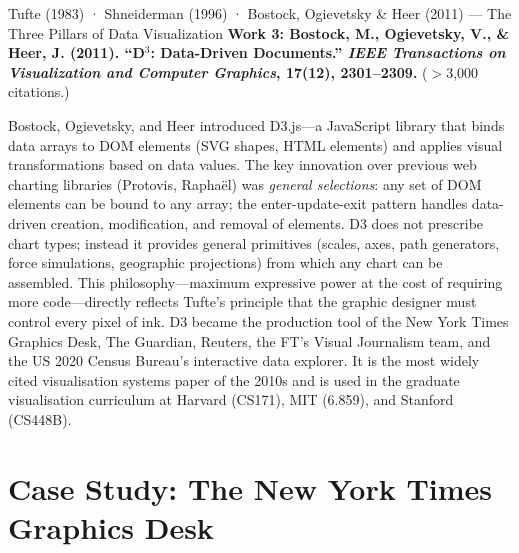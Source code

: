 \begin{researchspotlight}{Tufte (1983) · Shneiderman (1996) · Bostock,
Ogievetsky \& Heer (2011) --- The Three Pillars of Data Visualization}
\medskip
\textbf{Work 3: Bostock, M., Ogievetsky, V., \& Heer, J. (2011). ``D$^3$:
Data-Driven Documents.'' \textit{IEEE Transactions on Visualization and
Computer Graphics}, 17(12), 2301--2309.} ($>$3{,}000 citations.)

Bostock, Ogievetsky, and Heer introduced D3.js---a JavaScript library
that binds data arrays to DOM elements (SVG shapes, HTML elements) and
applies visual transformations based on data values. The key innovation
over previous web charting libraries (Protovis, Raphaël) was \emph{general
selections}: any set of DOM elements can be bound to any array; the
enter-update-exit pattern handles data-driven creation, modification, and
removal of elements. D3 does not prescribe chart types; instead it
provides general primitives (scales, axes, path generators, force
simulations, geographic projections) from which any chart can be assembled.
This philosophy---maximum expressive power at the cost of requiring more
code---directly reflects Tufte's principle that the graphic designer must
control every pixel of ink. D3 became the production tool of the New York
Times Graphics Desk, The Guardian, Reuters, the FT's Visual Journalism
team, and the US 2020 Census Bureau's interactive data explorer. It is the
most widely cited visualisation systems paper of the 2010s and is used in
the graduate visualisation curriculum at Harvard (CS171), MIT (6.859),
and Stanford (CS448B).
\end{researchspotlight}

\section{Case Study: The New York Times Graphics Desk}
\label{sec:nyt-case}

